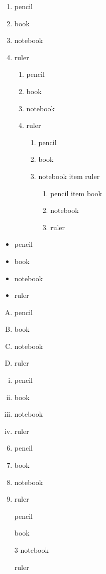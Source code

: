 \documentclass[12pt]{article}
\begin{document}
\begin{enumerate}
\item pencil
\item book
\item notebook
\item ruler
	\begin{enumerate}
	\item pencil
	\item book
	\item notebook
	\item ruler
		\begin{enumerate}
			\item pencil
			\item book
			\item notebook
			item ruler
			\begin{enumerate}
				\item pencil
				item book
				\item notebook
				\item ruler
			\end{enumerate}
		\end{enumerate}
	\end{enumerate}
\end{enumerate}

\begin{itemize}
\item pencil
\item book
\item notebook
\item ruler
\end{itemize}




\begin{enumerate}[A.]
	\item pencil
	\item book
	\item notebook
	\item ruler
\end{enumerate}


\begin{enumerate}[i.]
	\item pencil
	\item book
	\item notebook
	\item ruler
\end{enumerate}

\vspace{3cm}

\begin{enumerate}\setcounter{enumi}{5}
	\item pencil
	\item book
	\item notebook
	\item ruler
\end{enumerate}


\begin{enumerate}
	\item[] pencil
	\item[] book
	\item[3] notebook
	\item[] ruler
\end{enumerate}
\end{document}
